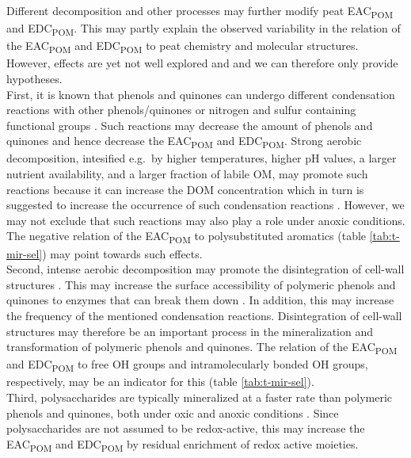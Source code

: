 \documentclass[alpha-refs, lineno]{wiley-article-rmd}
\begin{document}
Different decomposition and other processes may further modify peat EAC\textsubscript{POM} and EDC\textsubscript{POM}. This may partly explain the observed variability in the relation of the EAC\textsubscript{POM} and EDC\textsubscript{POM} to peat chemistry and molecular structures. However, effects are yet not well explored and and we can therefore only provide hypotheses.\\
First, it is known that phenols and quinones can undergo different condensation reactions with other phenols/quinones \autocite{Hotta.2002,Johnson.2015,Bolton.2018,Zhao.2020} or nitrogen and sulfur containing functional groups \autocite{Bolton.2018,Olk.2006,Heitmann.2006,Yu.2016}. Such reactions may decrease the amount of phenols and quinones and hence decrease the EAC\textsubscript{POM} and EDC\textsubscript{POM}. Strong aerobic decomposition, intesified e.g.~by higher temperatures, higher pH values, a larger nutrient availability, and a larger fraction of labile OM, may promote such reactions because it can increase the DOM concentration \autocite{Bragazza.2007,Fenner.2011,Kang.2018c,Bowring.2020} which in turn is suggested to increase the occurrence of such condensation reactions \autocite{Hotta.2002,Johnson.2015}. However, we may not exclude that such reactions may also play a role under anoxic conditions. The negative relation of the EAC\textsubscript{POM} to polysubstituted aromatics (table \ref{tab:t-mir-sel}) may point towards such effects.\\
Second, intense aerobic decomposition may promote the disintegration of cell-wall structures \autocite{Tsuneda.2001}. This may increase the surface accessibility of polymeric phenols and quinones to enzymes that can break them down \autocite{Tsuneda.2001}. In addition, this may increase the frequency of the mentioned condensation reactions. Disintegration of cell-wall structures may therefore be an important process in the mineralization and transformation of polymeric phenols and quinones. The relation of the EAC\textsubscript{POM} and EDC\textsubscript{POM} to free OH groups and intramolecularly bonded OH groups, respectively, may be an indicator for this (table \ref{tab:t-mir-sel}).\\
Third, polysaccharides are typically mineralized at a faster rate than polymeric phenols and quinones, both under oxic and anoxic conditions \autocite{Benner.1984}. Since polysaccharides are not assumed to be redox-active, this may increase the EAC\textsubscript{POM} and EDC\textsubscript{POM} by residual enrichment of redox active moieties.\\
\end{document}
